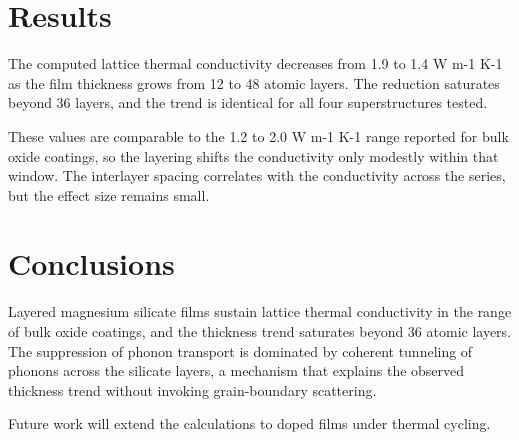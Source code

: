 \documentclass[12pt]{article}
\begin{document}
\section{Results}

The computed lattice thermal conductivity decreases from 1.9 to 1.4 W m-1 K-1 as the film
thickness grows from 12 to 48 atomic layers. The reduction saturates beyond 36 layers, and the
trend is identical for all four superstructures tested.

These values are comparable to the 1.2 to 2.0 W m-1 K-1 range reported for bulk oxide coatings,
so the layering shifts the conductivity only modestly within that window. The interlayer
spacing correlates with the conductivity across the series, but the effect size remains small.

\section{Conclusions}

Layered magnesium silicate films sustain lattice thermal conductivity in the range of bulk
oxide coatings, and the thickness trend saturates beyond 36 atomic layers. The suppression of
phonon transport is dominated by coherent tunneling of phonons across the silicate layers, a
mechanism that explains the observed thickness trend without invoking grain-boundary scattering.

Future work will extend the calculations to doped films under thermal cycling.
\end{document}
